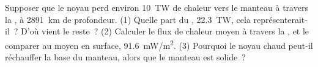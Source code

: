 \begin{exercise}[$\star\star\star$]\label{exo:g12:internal-heat:15}
Supposer que le noyau perd environ \qty{10}{TW} de chaleur vers le manteau
à travers la , à \qty{2891}{km} de profondeur. (1)
Quelle part du , \qty{22.3}{TW}, cela
représenterait-il~? D'où vient le reste~? (2) Calculer le flux de chaleur
moyen à travers la , et le comparer au  moyen en surface, \qty{91.6}{mW/m^2}. (3) Pourquoi le noyau
chaud peut-il réchauffer la base du manteau, alors que le manteau est
solide~?
\end{exercise}

